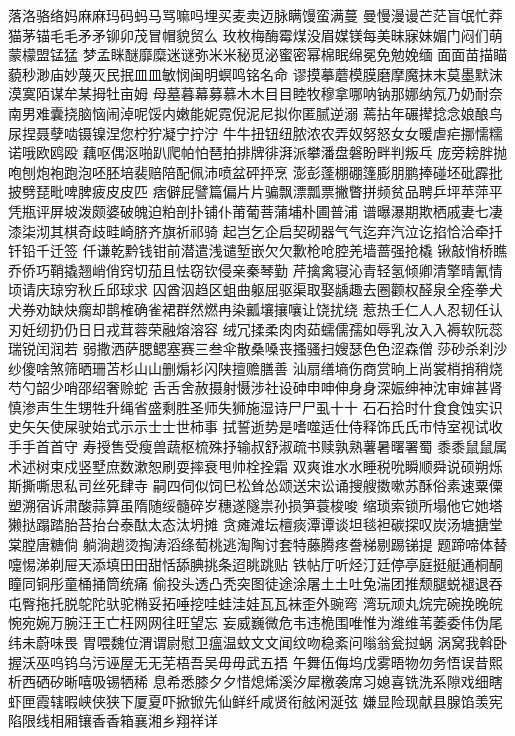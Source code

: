 落洛骆络妈⿇麻玛码蚂马骂嘛吗埋买麦卖迈脉瞒馒蛮满蔓
曼慢漫谩芒茫盲氓忙莽猫茅锚⽑毛⽭矛铆卯茂冒帽貌贸么
玫枚梅酶霉煤没眉媒镁每美昧寐妹媚门闷们萌蒙檬盟锰猛
梦孟眯醚靡糜迷谜弥⽶米秘觅泌蜜密幂棉眠绵冕免勉娩缅
⾯面苗描瞄藐秒渺庙妙蔑灭民抿⽫皿敏悯闽明螟鸣铭名命
谬摸摹蘑模膜磨摩魔抹末莫墨默沫漠寞陌谋牟某拇牡亩姆
母墓暮幕募慕⽊木⽬目睦牧穆拿哪呐钠那娜纳氖乃奶耐奈
南男难囊挠脑恼闹淖呢馁内嫩能妮霓倪泥尼拟你匿腻逆溺
蔫拈年碾撵捻念娘酿鸟尿捏聂孽啮镊镍涅您柠狞凝宁拧泞
⽜牛扭钮纽脓浓农弄奴努怒⼥女暖虐疟挪懦糯诺哦欧鸥殴
藕呕偶沤啪趴爬帕怕琶拍排牌徘湃派攀潘盘磐盼畔判叛乓
庞旁耪胖抛咆刨炮袍跑泡呸胚培裴赔陪配佩沛喷盆砰抨烹
澎彭蓬棚硼篷膨朋鹏捧碰坯砒霹批披劈琵毗啤脾疲⽪皮匹
痞僻屁譬篇偏⽚片骗飘漂瓢票撇瞥拼频贫品聘乒坪苹萍平
凭瓶评屏坡泼颇婆破魄迫粕剖扑铺仆莆葡菩蒲埔朴圃普浦
谱曝瀑期欺栖戚妻七凄漆柒沏其棋奇歧畦崎脐齐旗祈祁骑
起岂乞企启契砌器⽓气迄弃汽泣讫掐恰洽牵扦钎铅千迁签
仟谦乾黔钱钳前潜遣浅谴堑嵌⽋欠歉枪呛腔羌墙蔷强抢橇
锹敲悄桥瞧乔侨巧鞘撬翘峭俏窍切茄且怯窃钦侵亲秦琴勤
芹擒禽寝沁青轻氢倾卿清擎晴氰情顷请庆琼穷秋丘邱球求
囚酋泅趋区蛆曲躯屈驱渠取娶龋趣去圈颧权醛泉全痊拳⽝
犬券劝缺炔瘸却鹊榷确雀裙群然燃冉染瓤壤攘嚷让饶扰绕
惹热壬仁⼈人忍韧任认刃妊纫扔仍⽇日戎茸蓉荣融熔溶容
绒冗揉柔⾁肉茹蠕儒孺如辱乳汝⼊入褥软阮蕊瑞锐闰润若
弱撒洒萨腮鳃塞赛三叁伞散桑嗓丧搔骚扫嫂瑟⾊色涩森僧
莎砂杀刹沙纱傻啥煞筛晒珊苫杉⼭山删煽衫闪陕擅赡膳善
汕扇缮墒伤商赏晌上尚裳梢捎稍烧芍勺韶少哨邵绍奢赊蛇
⾆舌舍赦摄射慑涉社设砷申呻伸⾝身深娠绅神沈审婶甚肾
慎渗声⽣生甥牲升绳省盛剩胜圣师失狮施湿诗⼫尸虱⼗十
⽯石拾时什⾷食蚀实识史⽮矢使屎驶始式⽰示⼠士世柿事
拭誓逝势是嗜噬适仕侍释饰⽒氏市恃室视试收⼿手⾸首守
寿授售受瘦兽蔬枢梳殊抒输叔舒淑疏书赎孰熟薯暑曙署蜀
⿉黍⿏鼠属术述树束戍竖墅庶数漱恕刷耍摔衰甩帅栓拴霜
双爽谁⽔水睡税吮瞬顺舜说硕朔烁斯撕嘶思私司丝死肆寺
嗣四伺似饲巳松耸怂颂送宋讼诵搜艘擞嗽苏酥俗素速粟僳
塑溯宿诉肃酸蒜算虽隋随绥髓碎岁穗遂隧祟孙损笋蓑梭唆
缩琐索锁所塌他它她塔獭挞蹋踏胎苔抬台泰酞太态汰坍摊
贪瘫滩坛檀痰潭谭谈坦毯袒碳探叹炭汤塘搪堂棠膛唐糖倘
躺淌趟烫掏涛滔绦萄桃逃淘陶讨套特藤腾疼誊梯剔踢锑提
题蹄啼体替嚏惕涕剃屉天添填⽥田甜恬舔腆挑条迢眺跳贴
铁帖厅听烃汀廷停亭庭挺艇通桐酮瞳同铜彤童桶捅筒统痛
偷投头透凸秃突图徒途涂屠⼟土吐兔湍团推颓腿蜕褪退吞
屯臀拖托脱鸵陀驮驼椭妥拓唾挖哇蛙洼娃⽡瓦袜歪外豌弯
湾玩顽丸烷完碗挽晚皖惋宛婉万腕汪王亡枉⽹网往旺望忘
妄威巍微危韦违桅围唯惟为潍维苇萎委伟伪尾纬未蔚味畏
胃喂魏位渭谓尉慰卫瘟温蚊⽂文闻纹吻稳紊问嗡翁瓮挝蜗
涡窝我斡卧握沃巫呜钨乌污诬屋⽆无芜梧吾吴⽏毋武五捂
午舞伍侮坞戊雾晤物勿务悟误昔熙析西硒矽晰嘻吸锡牺稀
息希悉膝⼣夕惜熄烯溪汐犀檄袭席习媳喜铣洗系隙戏细瞎
虾匣霞辖暇峡侠狭下厦夏吓掀锨先仙鲜纤咸贤衔舷闲涎弦
嫌显险现献县腺馅羡宪陷限线相厢镶⾹香箱襄湘乡翔祥详
